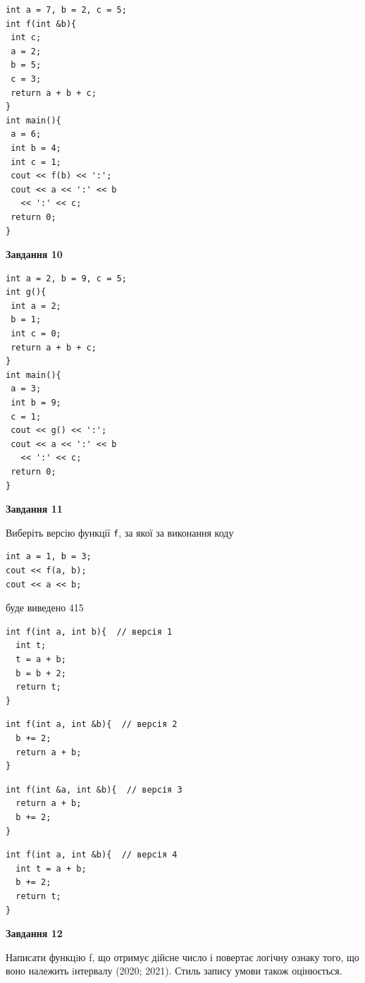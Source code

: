 \documentclass[12pt, ukrainian]{article}
\def\code#1{\Verb!#1!}
\begin{document}
{\begin {large}
\begin{minipage}[t]{7.0cm}
\begin{verbatim}
int a = 7, b = 2, c = 5;
int f(int &b){
 int c;
 a = 2;
 b = 5;
 c = 3;
 return a + b + c;
}
int main(){
 a = 6;
 int b = 4;
 int c = 1;
 cout << f(b) << ':';
 cout << a << ':' << b 
   << ':' << c;
 return 0;
}
\end{verbatim}



\begin{center}
\textbf{Завдання 10}
\end{center}
\vspace{-8mm}

\begin{verbatim}
int a = 2, b = 9, c = 5;
int g(){
 int a = 2;
 b = 1;
 int c = 0;
 return a + b + c;
}
int main(){
 a = 3;
 int b = 9;
 c = 1;
 cout << g() << ':';
 cout << a << ':' << b 
   << ':' << c;
 return 0;
}
\end{verbatim}

\end{minipage}
\vline \hspace{1mm}
\begin{minipage}[t]{11.0cm}

\begin{center}
\textbf{Завдання 11}
\end{center}
Виберіть версію функції \code{f}, за якої за виконання коду
\begin{verbatim}
int a = 1, b = 3;
cout << f(a, b);
cout << a << b;
\end{verbatim}

буде виведено 415

\begin{verbatim}
int f(int a, int b){  // версія 1
  int t;
  t = a + b;
  b = b + 2;
  return t;
}
\end{verbatim}

\vspace{-8mm}\begin{verbatim}
int f(int a, int &b){  // версія 2
  b += 2;
  return a + b;
}
\end{verbatim}

\vspace{-8mm}\begin{verbatim}
int f(int &a, int &b){  // версія 3
  return a + b;
  b += 2;
}
\end{verbatim}

\vspace{-8mm}\begin{verbatim}
int f(int a, int &b){  // версія 4
  int t = a + b;
  b += 2;
  return t;
}
\end{verbatim}



\begin{center}
\textbf{Завдання 12}
\end{center}

Написати функцiю f, що отримує дійсне число і повертає логічну ознаку того, що воно належить iнтервалу (2020; 2021). Стиль запису умови також оцінюється.\par

\end{minipage}

\end {large}}
\end{document}

